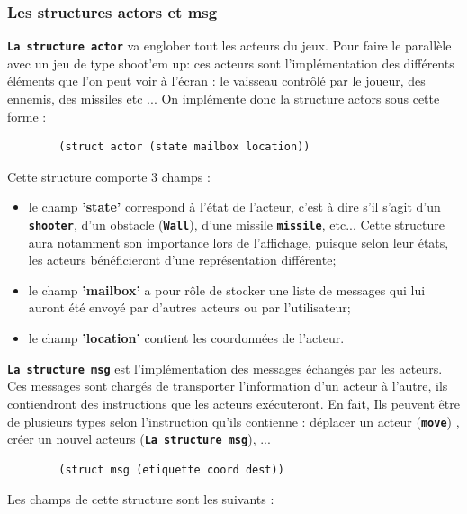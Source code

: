 \documentclass[a4paper,10pt]{article}
\begin{document}
\subsubsection{Les structures actors et msg}
\textbf{\texttt{La structure actor}} va englober tout les acteurs du jeux. Pour faire le parallèle avec un jeu de type shoot'em up: ces acteurs sont l'implémentation des différents éléments que l'on peut voir à l'écran : le vaisseau contrôlé par le joueur, des ennemis, des missiles etc ... 
\newline
On implémente donc la structure actors sous cette forme : 
        \begin{lstlisting}
        (struct actor (state mailbox location))
        \end{lstlisting}
Cette structure comporte 3 champs : \\
\begin{itemize}
    \item  le champ \textbf{'state'} correspond à l'état de l'acteur, c'est à dire s'il s'agit d'un \textbf{\texttt{shooter}}, d'un obstacle (\textbf{\texttt{Wall}}), d'une missile \textbf{\texttt{missile}}, etc... Cette structure aura notamment son importance lors de l'affichage, puisque selon leur états, les acteurs bénéficieront d'une représentation différente;\\
    \item le champ \textbf{'mailbox'} a pour rôle de stocker une liste de messages qui lui auront été envoyé par d'autres acteurs ou par l'utilisateur;\\
    \item le champ \textbf{'location'} contient les coordonnées de l'acteur.\\
\end{itemize} 
\hfill
\newline
\textbf{\texttt{La structure msg}} est l'implémentation des messages échangés par les acteurs. Ces messages sont chargés de transporter l’information d’un acteur à l’autre, ils contiendront des instructions que les acteurs exécuteront. En fait, Ils peuvent être de plusieurs types selon l'instruction qu'ils contienne : déplacer un acteur (\textbf{\texttt{move}}) , créer un nouvel acteurs (\textbf{\texttt{La structure msg}}), ...
        \begin{lstlisting}
        (struct msg (etiquette coord dest))
        \end{lstlisting}
Les champs de cette structure sont les suivants : \\
\end{document}

